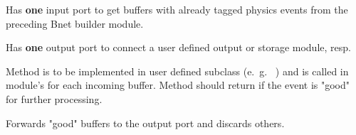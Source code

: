 \begin{description}
\begin{compactenum}
  \item Has {\bf one} input port to get buffers with 
      already tagged physics events from the preceding Bnet builder module.
  \item Has {\bf one} output port to connect a user defined output or storage module, resp.
  \item Method  is to be implemented in user 
      defined subclass (e.~g.~ ) and is called in 
      module's  for each incoming buffer. 
      Method should return  if the event is "good" for further processing.
  \item Forwards "good" buffers to the output port and discards others.
\end{compactenum}
\end{description}